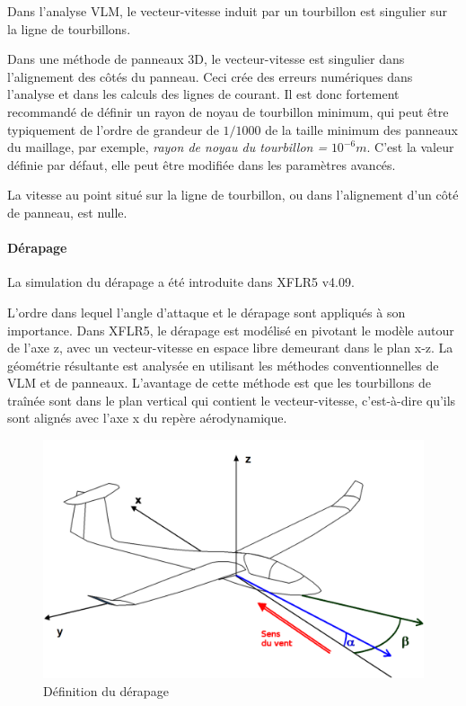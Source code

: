 \documentclass[a4paper,twoside,12pt,dvips]{article}
\begin{document}
Dans l’analyse VLM, le vecteur-vitesse induit par un tourbillon est singulier sur la ligne de tourbillons.

Dans une méthode de panneaux 3D, le vecteur-vitesse est singulier dans l’alignement des côtés du panneau. Ceci crée des erreurs numériques dans l’analyse et dans les calculs des lignes de courant. Il est donc fortement recommandé de définir un rayon de noyau de tourbillon minimum, qui peut être typiquement de l’ordre de grandeur de $1/1000$ de la taille minimum des panneaux du maillage, par exemple, \emph{rayon de noyau du tourbillon =} $10^{-6}m$. C’est la valeur définie par défaut, elle peut être modifiée dans les paramètres avancés.

La vitesse au point situé sur la ligne de tourbillon, ou dans l’alignement 
d’un côté de panneau, est nulle. 

\paragraph{Dérapage}

La simulation du dérapage a été introduite dans XFLR5 v4.09.

L’ordre dans lequel l’angle d’attaque et le dérapage sont appliqués à son
importance. Dans XFLR5, le dérapage est modélisé en pivotant le modèle autour
de l’axe z, avec un vecteur-vitesse en espace libre demeurant dans le plan x-z. La géométrie résultante est analysée en utilisant les méthodes conventionnelles de VLM et de panneaux. L’avantage de cette méthode est que les tourbillons de traînée sont dans le plan vertical qui contient le vecteur-vitesse, c’est-à-dire qu’ils sont alignés avec l’axe x du repère aérodynamique.

\begin{figure}[htbp]
	\centering
	\includegraphics[width=0.8\linewidth]{img-27-fr}
	\caption{Définition du dérapage}
	\label{img:définition_dérapage}
\end{figure}
\end{document}
